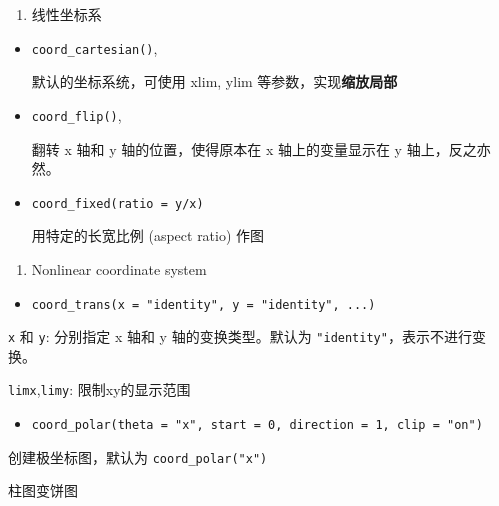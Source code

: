 \documentclass[
]{article}
\begin{document}
\begin{enumerate}
\def\labelenumi{\arabic{enumi}.}
\item
  线性坐标系
\end{enumerate}

\begin{itemize}
\item
  \texttt{coord\_cartesian()},

  默认的坐标系统，可使用 xlim, ylim 等参数，实现\textbf{缩放局部}
\item
  \texttt{coord\_flip()},

  翻转 x 轴和 y 轴的位置，使得原本在 x 轴上的变量显示在 y
  轴上，反之亦然。
\item
  \texttt{coord\_fixed(ratio\ =\ y/x)}

  用特定的长宽比例 (aspect ratio) 作图
\end{itemize}

\begin{enumerate}
\def\labelenumi{\arabic{enumi}.}
\item
  Nonlinear coordinate system
\end{enumerate}

\begin{itemize}
\item
  \texttt{coord\_trans(x\ =\ "identity",\ y\ =\ "identity",\ ...)}
\end{itemize}

\texttt{x} 和 \texttt{y}: 分别指定 x 轴和 y 轴的变换类型。默认为
\texttt{"identity"}，表示不进行变换。

\texttt{limx},\texttt{limy}: 限制xy的显示范围

\begin{itemize}
\item
  \texttt{coord\_polar(theta\ =\ "x",\ start\ =\ 0,\ direction\ =\ 1,\ clip\ =\ "on")}
\end{itemize}

创建极坐标图，默认为 \texttt{coord\_polar("x")}

柱图变饼图
\end{document}

